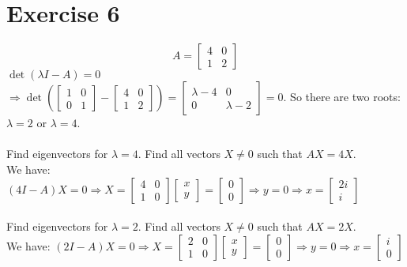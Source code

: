 \documentclass{article}
\begin{document}
\section*{Exercise 6}
\[
A=
  \begin{bmatrix}
    4 & 0 \\
    1 & 2 
  \end{bmatrix}
\]
$\det(\lambda I-A) = 0$ \\
$\Rightarrow \det\left( 
\begin{bmatrix}
    1 & 0 \\
    0 & 1 
\end{bmatrix} -
\begin{bmatrix}
    4 & 0 \\
    1 & 2 
\end{bmatrix}\right) = 
\begin{bmatrix}
    \lambda - 4  & 0 \\
    0 & \lambda -2 
\end{bmatrix} = 0.$
So there are two roots: \\
$\lambda = 2$ or $\lambda = 4$.    
\\
\\
Find eigenvectors for $\lambda = 4$. Find all vectors $X \neq 0$ such that $AX = 4X$.
\\
We have:
$(4I - A) X = 0 \Rightarrow X =   
\begin{bmatrix}
    4 & 0 \\
    1 & 0 
\end{bmatrix}
\begin{bmatrix}
    x  \\
    y  
\end{bmatrix} = \begin{bmatrix}
    0  \\
    0  
\end{bmatrix} \Rightarrow y = 0 \Rightarrow x = \begin{bmatrix}
2i  \\
i  
\end{bmatrix}$
\\
\\
Find eigenvectors for $\lambda = 2$. Find all vectors $X \neq 0$ such that $AX = 2X$.
\\
We have:
$(2I - A) X = 0 \Rightarrow X =   
\begin{bmatrix}
    2 & 0 \\
    1 & 0 
\end{bmatrix}
\begin{bmatrix}
    x  \\
    y  
\end{bmatrix} = \begin{bmatrix}
    0  \\
    0  
\end{bmatrix} \Rightarrow y = 0 \Rightarrow x = \begin{bmatrix}
i  \\
0  
\end{bmatrix}$
\end{document}
